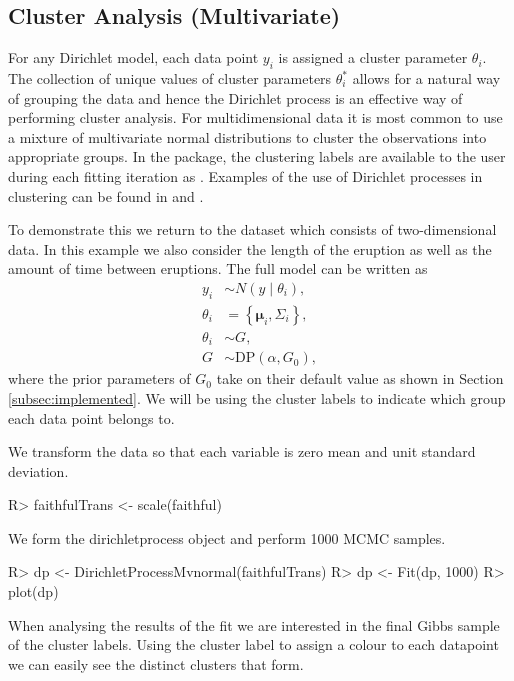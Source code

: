 \documentclass[nojss]{jss}
\begin{document}
\subsection{Cluster Analysis (Multivariate)} \label{subsec:clusteranalysis}
For any Dirichlet model, each data point $y_i$ is assigned a cluster parameter $\theta _i$. The collection of unique values of cluster parameters $\theta _i ^*$ allows for a natural way of grouping the data and hence the Dirichlet process is an effective way of performing cluster analysis. For multidimensional data it is most common to use a mixture of multivariate normal distributions to cluster the observations into appropriate groups. In the  package, the clustering labels are available to the user during each fitting iteration as . Examples of the use of Dirichlet processes in clustering can be found in \cite{teh_sharing_2005} and \cite{kim_variable_2006}.

To demonstrate this we return to the  dataset which consists of two-dimensional data. In this example we also consider the length of the eruption as well as the amount of time between eruptions. The full model can be written as
\begin{align*}
y _i & \sim N (y \mid \theta_i ), \\
\theta_i & =  \left\lbrace \boldsymbol{\mu}_i, \Sigma _i \right\rbrace , \\
\theta _i & \sim G, \\
G & \sim \text{DP} ( \alpha, G_0 ),
\end{align*}
where the prior parameters of $G_0$ take on their default value as shown in Section \ref{subsec:implemented}. We will be using the cluster labels to indicate which group each data point belongs to.

We transform the data so that each variable is zero mean and unit standard deviation.
\begin{CodeInput}
R> faithfulTrans <- scale(faithful)
\end{CodeInput}
We form the dirichletprocess object and perform 1000 MCMC samples.
\begin{CodeInput}
R> dp <- DirichletProcessMvnormal(faithfulTrans)
R> dp <- Fit(dp, 1000)
R> plot(dp)
\end{CodeInput}
When analysing the results of the fit we are interested in the final Gibbs sample of the cluster labels. Using the cluster label to assign a colour to each datapoint we can easily see the distinct clusters that form.
\end{document}
